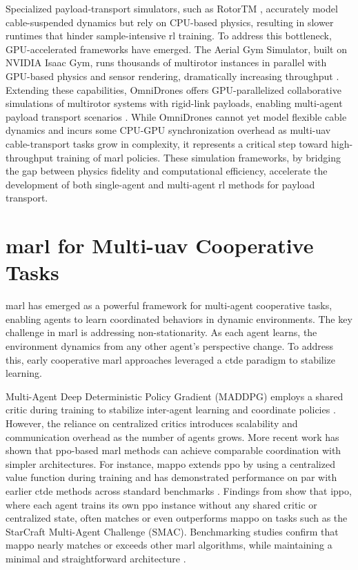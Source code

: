 Specialized payload-transport simulators, such as RotorTM \cite{Li2022RotorTMAF}, accurately model cable-suspended dynamics but rely on CPU-based physics, resulting in slower runtimes that hinder sample-intensive \gls{rl} training. To address this bottleneck, GPU-accelerated frameworks have emerged. The Aerial Gym Simulator, built on NVIDIA Isaac Gym, runs thousands of multirotor instances in parallel with GPU-based physics and sensor rendering, dramatically increasing throughput \cite{aerial_gym_simulator}. Extending these capabilities, OmniDrones offers GPU-parallelized collaborative simulations of multirotor systems with rigid-link payloads, enabling multi-agent payload transport scenarios \cite{xu_omnidrones_2024}. While OmniDrones cannot yet model flexible cable dynamics and incurs some CPU-GPU synchronization overhead as multi-\gls{uav} cable-transport tasks grow in complexity, it represents a critical step toward high-throughput training of \gls{marl} policies. These simulation frameworks, by bridging the gap between physics fidelity and computational efficiency, accelerate the development of both single-agent and multi-agent \gls{rl} methods for payload transport.


\section{\gls{marl} for Multi-\gls{uav} Cooperative Tasks}

\gls{marl} has emerged as a powerful framework for multi-agent cooperative tasks, enabling agents to learn coordinated behaviors in dynamic environments. The key challenge in \gls{marl} is addressing non-stationarity. As each agent learns, the environment dynamics from any other agent's perspective change. To address this, early cooperative \gls{marl} approaches leveraged a \gls{ctde}  paradigm to stabilize learning.

Multi-Agent Deep Deterministic Policy Gradient (MADDPG) employs a shared critic during training to stabilize inter-agent learning and coordinate policies \cite{Lowe2017MultiAgentAF}. However, the reliance on centralized critics introduces scalability and communication overhead as the number of agents grows. More recent work has shown that \gls{ppo}-based \gls{marl} methods can achieve comparable coordination with simpler architectures. For instance, \gls{mappo} extends \gls{ppo} by using a centralized value function during training and has demonstrated performance on par with earlier \gls{ctde} methods across standard benchmarks \cite{yu_surprising_2022}. Findings from \cite{witt_is_2020} show that \gls{ippo}, where each agent trains its own \gls{ppo} instance without any shared critic or centralized state, often matches or even outperforms \gls{mappo} on tasks such as the StarCraft Multi-Agent Challenge (SMAC). Benchmarking studies confirm that \gls{mappo} nearly matches or exceeds other \gls{marl} algorithms, while maintaining a minimal and straightforward architecture \cite{Papoudakis2020BenchmarkingMD}.

